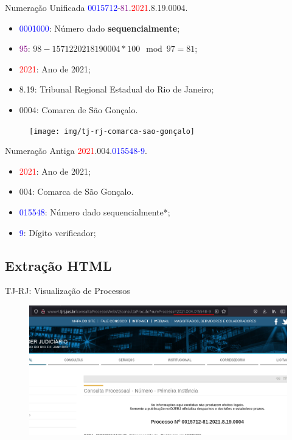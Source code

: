 \begin{frame}{Numeração Unificada}
    \textcolor{blue}{0015712}-\textcolor{purple}{81}.\textcolor{red}{2021}.8.19.\textcolor{green!50!black}{0004}.

    \begin{itemize}
        \item \textcolor{blue}{0001000}: Número dado \textbf{sequencialmente};
        \item \textcolor{purple}{95}: $98 -1571220218190004 * 100 \mod 97 = 81$;
        \item \textcolor{red}{2021}: Ano de 2021;
        \item 8.19: Tribunal Regional Estadual do Rio de Janeiro;
        \item \textcolor{green!50!black}{0004}: Comarca de São Gonçalo.
    \end{itemize}

    \begin{figure}[H]
        \texttt{[image: img/tj-rj-comarca-sao-gonçalo]}
    \end{figure}
\end{frame}

\begin{frame}{Numeração Antiga}
    \textcolor{red}{2021}.\textcolor{green!50!black}{004}.\textcolor{blue}{015548-9}.

    \begin{itemize}
        \item \textcolor{red}{2021}: Ano de 2021;
        \item \textcolor{green!50!black}{004}: Comarca de São Gonçalo.
        \item \textcolor{blue}{015548}: Número dado sequencialmente*;
        \item \textcolor{blue}{9}: Dígito verificador;
    \end{itemize}
\end{frame}

\subsection{Extração HTML}

\begin{frame}{TJ-RJ: Visualização de Processos}
    \begin{figure}[htb]
        \includegraphics[keepaspectratio,width=1\textwidth]{img/tj-rj-1}
    \end{figure}
\end{frame}

